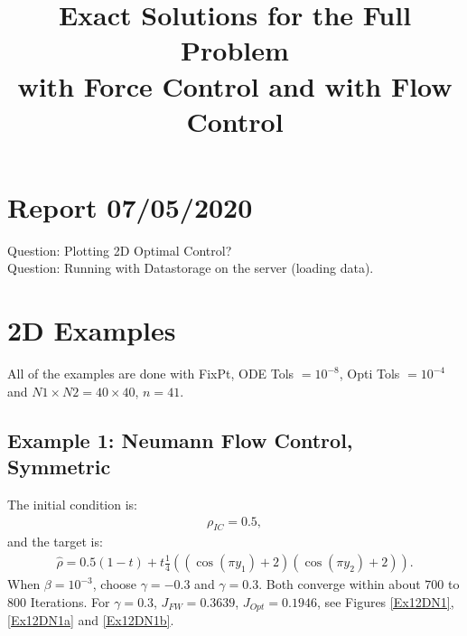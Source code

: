 \documentclass[11pt, a4paper]{article}
\title{Exact Solutions for the Full Problem \\with Force Control and with Flow Control}
\date{}
\theoremstyle{definition}
\begin{document}
	
\section*{Report 07/05/2020}
Question: Plotting 2D Optimal Control?\\
Question: Running with Datastorage on the server (loading data).
\section{2D Examples}
All of the examples are done with FixPt, ODE Tols $= 10^{-8}$, Opti Tols $= 10^{-4}$ and $N1 \times N2 = 40 \times 40$, $n = 41$.
\subsection{Example 1: Neumann Flow Control, Symmetric}
The initial condition is:
\begin{align*}
\rho_{IC} = 0.5,
\end{align*}
and the target is:
\begin{align*}
\hat \rho = 0.5(1-t) + t\frac{1}{4}((\cos(\pi y_1)+2)(\cos(\pi y_2)+2)).
\end{align*}
When $\beta = 10^{-3}$, choose $\gamma = -0.3$ and $\gamma = 0.3$. Both converge within about $700$ to $800$ Iterations.
For $\gamma=0.3$, $J_{FW} = 0.3639$, $J_{Opt} = 0.1946$, see Figures \ref{Ex12DN1}, \ref{Ex12DN1a} and \ref{Ex12DN1b}.
\end{document}
